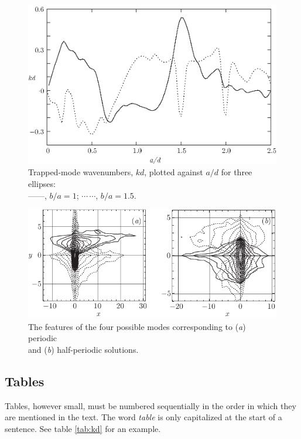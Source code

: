 \documentclass[12pt]{Style/RBM_P}
\begin{document}
\begin{figure}
  \centering
  \includegraphics{image/trapped.eps}%
  \caption{Trapped-mode wavenumbers, $kd$, plotted against $a/d$ for
    three ellipses:\protect\\%
    ---$\!$---,
    $b/a=1$; $\cdots$\,$\cdots$, $b/a=1.5$.}
\label{fig:ka}
\end{figure}

\begin{figure}
  \centering
  \includegraphics{image/modes}
  \caption{The features of the four possible modes corresponding to
  (\textit{a}) periodic\protect\\ and (\textit{b}) half-periodic solutions.}
\label{fig:kd}
\end{figure}

\subsection{Tables}
Tables, however small, must be numbered sequentially in the order in which they are mentioned in the text. The word \textit {table} is only capitalized at the start of a sentence. See table \ref{tab:kd} for an example.
\end{document}
